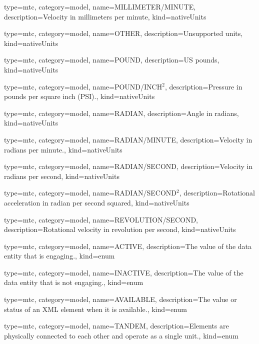{
  type=mtc,
  category=model,
  name={MILLIMETER/MINUTE},
  description={Velocity in millimeters per minute},
  kind={nativeUnits}
}


{
  type=mtc,
  category=model,
  name={OTHER},
  description={Unsupported units},
  kind={nativeUnits}
}


{
  type=mtc,
  category=model,
  name={POUND},
  description={US pounds},
  kind={nativeUnits}
}


{
  type=mtc,
  category=model,
  name={POUND/INCH$^2$},
  description={Pressure in pounds per square inch (PSI).},
  kind={nativeUnits}
}


{
  type=mtc,
  category=model,
  name={RADIAN},
  description={Angle in radians},
  kind={nativeUnits}
}


{
  type=mtc,
  category=model,
  name={RADIAN/MINUTE},
  description={Velocity in radians per minute.},
  kind={nativeUnits}
}


{
  type=mtc,
  category=model,
  name={RADIAN/SECOND},
  description={Velocity in radians per second},
  kind={nativeUnits}
}


{
  type=mtc,
  category=model,
  name={RADIAN/SECOND$^2$},
  description={Rotational acceleration in radian per second squared},
  kind={nativeUnits}
}


{
  type=mtc,
  category=model,
  name={REVOLUTION/SECOND},
  description={Rotational velocity in revolution per second},
  kind={nativeUnits}
}


{
  type=mtc,
  category=model,
  name={ACTIVE},
  description={The value of the \gls{data entity} that is engaging.},
  kind={enum}
}


{
  type=mtc,
  category=model,
  name={INACTIVE},
  description={The value of the \gls{data entity} that is not engaging.},
  kind={enum}
}


{
  type=mtc,
  category=model,
  name={AVAILABLE},
  description={The value or status of an XML element when it is available.},
  kind={enum}
}


{
  type=mtc,
  category=model,
  name={TANDEM},
  description={Elements are physically connected to each other and operate as a single unit.},
  kind={enum}
}


